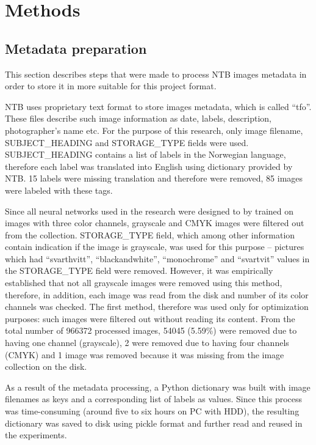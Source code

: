 \chapter{Methods}
\label{chap:methods}

\section{Metadata preparation}
This section describes steps that were made to process NTB images metadata in order to store it in more suitable for this project format.

NTB uses proprietary text format to store images metadata, which is called ``tfo''. These files describe such image information as date, labels, description, photographer's name etc. For the purpose of this research, only image filename, SUBJECT\_HEADING and STORAGE\_TYPE fields were used. SUBJECT\_HEADING contains a list of labels in the Norwegian language, therefore each label was translated into English using dictionary provided by NTB. 15 labels were missing translation and therefore were removed, 85 images were labeled with these tags.

Since all neural networks used in the research were designed to by trained on images with three color channels, grayscale and CMYK images were filtered out from the collection. STORAGE\_TYPE field, which among other information contain indication if the image is grayscale, was used for this purpose -- pictures which had ``svarthvitt'', ``blackandwhite'', ``monochrome'' and ``svartvit'' values in the STORAGE\_TYPE field were removed. However, it was empirically established that not all grayscale images were removed using this method, therefore, in addition, each image was read from the disk and number of its color channels was checked. The first method, therefore was used only for optimization purposes: such images were filtered out without reading its content. From the total number of 966372 processed images, 54045 (5.59\%) were removed due to having one channel (grayscale), 2 were removed due to having four channels (CMYK) and 1 image was removed because it was missing from the image collection on the disk.

As a result of the metadata processing, a Python dictionary was built with image filenames as keys and a corresponding list of labels as values. Since this process was time-consuming (around five to six hours on PC with HDD), the resulting dictionary was saved to disk using pickle \cite{pickle} format and further read and reused in the experiments.

